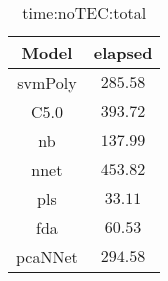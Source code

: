 \begin{table}[!ht]
	\centering
	\begin{tabular}{|c|c|}
		\hline
		Model & elapsed \\ \hline
		svmPoly & $285.58$ \\ \hline
		C5.0 & $393.72$ \\ \hline
		nb & $137.99$ \\ \hline
		nnet & $453.82$ \\ \hline
		pls & $33.11$ \\ \hline
		fda & $60.53$ \\ \hline
		pcaNNet & $294.58$ \\ \hline
	\end{tabular}
	\caption{time:noTEC:total}
	\label{tab:time:noTEC:total}
\end{table}
